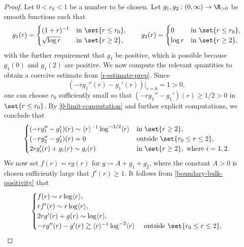 \documentclass[10pt, reqno]{amsart}
\begin{document}
\begin{proof}
Let \(0 < r_0 < 1\) be a number to be chosen. Let \(g_1,g_2 : (0,\infty)\to \R_{>0}\)
be smooth functions such that
\begin{equation}
g_1(r) = \begin{cases}
(1+r)^{-1}&\textnormal{in }\set{r\le r_0},\\
\sqrt{\log r}&\textnormal{in }\set{r\ge 2},\\
\end{cases}
\qquad g_2(r) = \begin{cases}
0&\textnormal{in }\set{r\le r_0}, \\
\log r&\textnormal{in }\set{r\ge 2},
\end{cases}
\end{equation}
with the further requirement that \(g_1\) be positive, which is possible because
\(g_1(0)\) and \(g_1(2)\) are positive. We now compute the relevant quantities
to obtain a coercive estimate from \cref{r-estimate-prep}. Since
\begin{equation}\label{0-limit-computation}
(-rg_1''(r) - g_1'(r))|_{r=0} = 1 > 0,
\end{equation}
one can choose \(r_0\) sufficiently small so that \((-rg_1''-g_1')(r)\ge
1/2> 0\) in \(\set{r\le r_0}\). By \cref{0-limit-computation} and further explicit computations, we conclude that
\begin{equation}\label{boundary-bulk-positivity}
\begin{cases}
(-rg_1'' - g_1')(r)\sim \langle{}r\rangle{}^{-1}\log ^{-3/2}\langle{}r\rangle{}&\textnormal{in }\set{r\ge 2}, \\
(-rg_2'' - g_2')(r) = 0&\textnormal{outside }\set{r_0\le r\le 2},\\
2rg_i'(r) + g_i(r) \sim g_i(r)&\textnormal{in }\set{r\ge 2},\textnormal{ where }i=1,2.
\end{cases}
\end{equation}
We now set \(f(r) = rg(r)\) for \(g \coloneqq{}A + g_1 + g_2\), where the constant \(A >
0\) is chosen sufficiently large that \(f'(r)\ge 1\). It follows from
\cref{boundary-bulk-positivity} that
\begin{equation}
\begin{cases}
f(r)\sim r\log \langle{}r\rangle{}, \\
rf'(r)\sim r\log \langle{}r\rangle{}, \\
2rg'(r) + g(r)\sim \log\langle{}r\rangle{}, \\
-rg''(r) - g'(r)\gtrsim \langle{}r\rangle{}^{-1}\log^{-2}\langle{}r\rangle{}&\textnormal{ outside }\set{r_0\le r\le 2}, \\

\end{cases}
\end{equation}
\end{proof}
\end{document}
